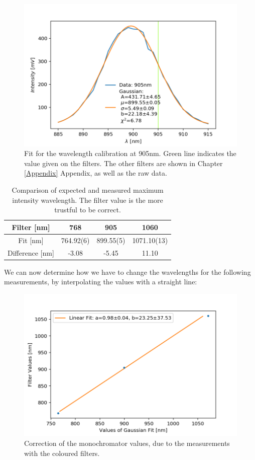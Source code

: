 \documentclass[]{article}
\begin{document}
\begin{figure}[H]
\centering
\includegraphics[width=.9\textwidth]{Plots/905nm-Filter.png}
\caption{Fit for the wavelength calibration at 905nm. Green line indicates the value given on the filters. The other filters are shown in Chapter \ref{Appendix} Appendix, as well as the raw data.}
\end{figure}

\begin{table}[H]
	\centering
	\begin{tabular}{c|c|c|c}
	Filter [nm] & 768 & 905 & 1060 \\ \hline
	Fit [nm] & 764.92(6) & 899.55(5) & 1071.10(13) \\ \hline
	Difference [nm] & -3.08 & -5.45 & 11.10
	\end{tabular}
	\caption{Comparison of expected and measured maximum intensity wavelength. The filter value is the more trustful to be correct.}
\end{table}

We can now determine how we have to change the wavelengths for the following measurements, by interpolating the values with a straight line:

\begin{figure}[H]
\centering
\includegraphics[width=.9\textwidth]{Plots/LambdaCorrection.png}
\caption{Correction of the monochromator values, due to the measurements with the coloured filters.}
\label{fig:LambdaCorrection}
\end{figure}
\end{document}
